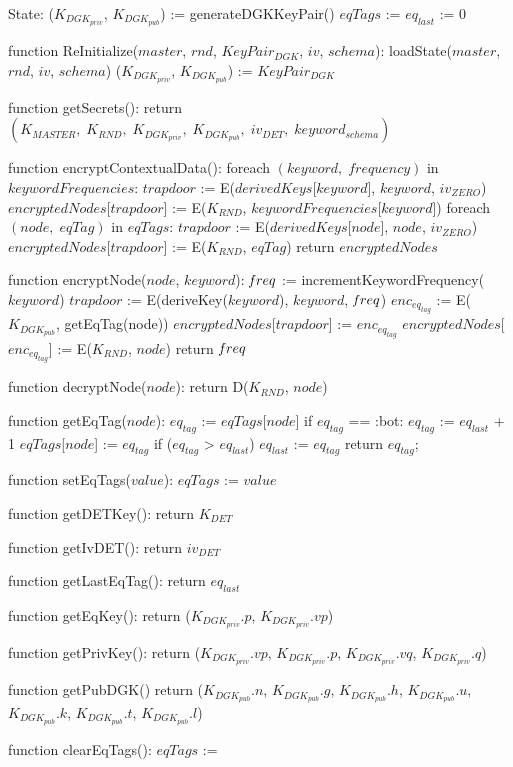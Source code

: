 State:
    ($K_{DGK_{priv}}$, $K_{DGK_{pub}}$) := generateDGKKeyPair()
    $eqTags$ := {}
    $eq_{last}$ := 0

function ReInitialize($master$, $rnd$, $KeyPair_{DGK}$, $iv$, $schema$):
    loadState($master$, $rnd$, $iv$, $schema$)
    ($K_{DGK_{priv}}$, $K_{DGK_{pub}}$) := $KeyPair_{DGK}$

function getSecrets():
    return $(K_{MASTER}, \; K_{RND}, \; K_{DGK_{priv}}, \; K_{DGK_{pub}}, \; iv_{DET}, \; keyword_{schema})$

function encryptContextualData():
    foreach $(keyword, \; frequency)$ in $keywordFrequencies$:
        $trapdoor$ := E($derivedKeys$[$keyword$], $keyword$, $iv_{ZERO}$)
        $encryptedNodes$[$trapdoor$] := E($K_{RND}$, $keywordFrequencies$[$keyword$])
    foreach $(node, \; eqTag)$ in $eqTags$:
        $trapdoor$ := E($derivedKeys$[$node$], $node$, $iv_{ZERO}$)
        $encryptedNodes$[$trapdoor$] := E($K_{RND}$, $eqTag$)
    return $encryptedNodes$
        
function encryptNode($node$, $keyword$):
    $\textrm{\emph{f}}req$ := incrementKeywordFrequency($keyword$)
    $trapdoor$ := E(deriveKey($keyword$), $keyword$, $\textrm{\emph{f}}req$)
    $enc_{eq_{tag}}$ := E($K_{DGK_{pub}}$, getEqTag(node))
    $encryptedNodes$[$trapdoor$] := $enc_{eq_{tag}}$
    $encryptedNodes$[$enc_{eq_{tag}}$] := E($K_{RND}$, $node$)
    return $\textrm{\emph{f}}req$

function decryptNode($node$):
    return D($K_{RND}$, $node$)

function getEqTag($node$):
    $eq_{tag}$ := $eqTags$[$node$]
    if $eq_{tag}$ == :bot:
        $eq_{tag}$ := $eq_{last}$ + 1
        $eqTags$[$node$] := $eq_{tag}$
    if ($eq_{tag}$ > $eq_{last}$)
        $eq_{last}$ := $eq_{tag}$
    return $eq_{tag}$;
    
function setEqTags($value$):
    $eqTags$ := $value$

function getDETKey():
    return $K_{DET}$

function getIvDET():
    return $iv_{DET}$

function getLastEqTag():
    return $eq_{last}$

function getEqKey():
    return ($K_{DGK_{priv}}.p$, $K_{DGK_{priv}}.vp$)

function getPrivKey():
    return ($K_{DGK_{priv}}.vp$, $K_{DGK_{priv}}.p$, $K_{DGK_{priv}}.vq$, $K_{DGK_{priv}}.q$)

function getPubDGK()
    return ($K_{DGK_{pub}}.n$, $K_{DGK_{pub}}.g$, $K_{DGK_{pub}}.h$, $K_{DGK_{pub}}.u$, $K_{DGK_{pub}}.k$, $K_{DGK_{pub}}.t$, $K_{DGK_{pub}}.l$)

function clearEqTags():
    $eqTags$ := {}

